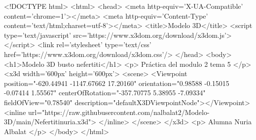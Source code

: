 <!DOCTYPE html>
<html>
<head>
<meta http-equiv='X-UA-Compatible' content='chrome=1'></meta>
<meta http-equiv='Content-Type' content='text/html;charset=utf-8'></meta>
<title>Modelo 3D</title>
<script type='text/javascript' src='https://www.x3dom.org/download/x3dom.js'> </script>
<link rel='stylesheet' type='text/css' href='https://www.x3dom.org/download/x3dom.css'/>
</head>
<body>
<h1>Modelo 3D busto nefertiti</h1>
<p>
    Práctica del modulo 2 tema 5
</p>
<x3d width='600px' height='600px'>
<scene>
	<Viewpoint position="-620.44941 -1147.67662 17.20160" orientation="0.98588 -0.15015 -0.07414 1.55567" 
		centerOfRotation="-357.70775 5.38955 -7.09334" fieldOfView="0.78540" description="defaultX3DViewpointNode"></Viewpoint>
<inline url="https://raw.githubusercontent.com/nalbalat2/Modelo-3D/main/Nefertitinuria.x3d"> </inline>
</scene>
</x3d>
<p>
    Alumna Nuria Albalat
</p>
  </body>
</html>
